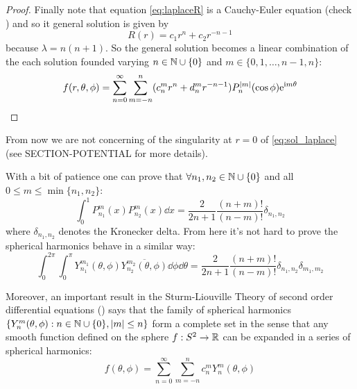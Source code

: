 \documentclass[../main.tex]{subfiles}
\begin{document}
\begin{proof}
  Finally note that equation \cref{eq:laplaceR} is a Cauchy-Euler equation (check \cite{wiki:cauchy-euler}) and so it general solution is given by
  \begin{equation}
    R(r) = c_1 r^{n} + c_2 r^{-n-1}
  \end{equation}
  because $\lambda = n(n+1)$. So the general solution becomes a linear combination of the each solution founded varying $n\in\mathbb{N}\cup\{0\}$ and $m\in\{0,1,\dots,n-1,n\}$:
  \begin{equation}
    f(r,\theta,\phi) = \sum_{n=0}^\infty \sum_{m=-n}^n (c_{n}^m r^{n} +d_n^mr^{-n-1})P_n^\abs{m}(\cos\phi) \mathrm{e}^{\mathrm{i} m\theta}
  \end{equation}
\end{proof}
From now we are not concerning of the singularity at $r=0$ of \cref{eq:sol_laplace} (see SECTION-POTENTIAL for more details).

With a bit of patience one can prove that $\forall n_1,n_2\in\mathbb{N}\cup\{0\}$ and all $0\leq m\leq\min\{n_1,n_2\}$:
\begin{equation}
  \int_0^1 P_{n_1}^{m}(x) P_{n_2}^{m}(x) \dd{x}=\frac{2}{2n+1}\frac{(n+m)!}{(n-m)!} \delta_{n_1,n_2}
\end{equation}
where $\delta_{n_1,n_2}$ denotes the Kronecker delta.
From here it's not hard to prove the spherical harmonics behave in a similar way:
\begin{equation}
  \int_0^{2\pi}\int_0^\pi Y_{n_1}^{m_1}(\theta,\phi) \overline{Y_{n_2}^{m_2}(\theta,\phi)} \dd{\phi}\dd{\theta}=\frac{2}{2n+1}\frac{(n+m)!}{(n-m)!} \delta_{n_1,n_2}\delta_{m_1,m_2}
\end{equation}

Moreover, an important result in the Sturm-Liouville Theory of second order differential equations (\cite{wiki:sturm-liouville,completeness_SL}) says that the family of spherical harmonics $\{Y_n^m(\theta,\phi):n\in\mathbb{N}\cup\{0\},\abs{m}\leq n\}$ form a complete set in the sense that any smooth function defined on the sphere $f:S^2\rightarrow\mathbb{R}$ can be expanded in a series of spherical harmonics:
\begin{equation}
  f(\theta,\phi)=\sum_{n=0}^\infty\sum_{m=-n}^n c_{n}^m Y_n^m(\theta,\phi)
\end{equation}
\end{document}
